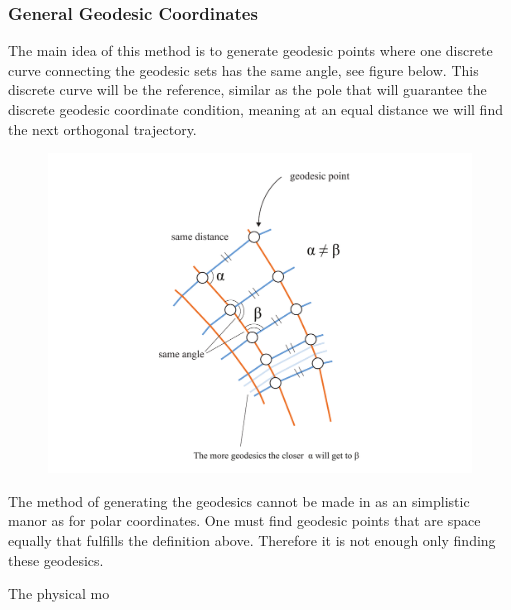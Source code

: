 \subsubsection{General Geodesic Coordinates}

The main idea of this method is to generate geodesic points where one discrete curve connecting the geodesic sets has the same angle, see figure below. This discrete curve will be the reference, similar as the pole that will guarantee the discrete geodesic coordinate condition, meaning at an equal distance we will find the next orthogonal trajectory.

\begin{figure}[H]
\centering
\includegraphics[width=0.9\linewidth ]{figure/Method/discreteGeodesicCoord2.pdf}
\caption{}
\end{figure}

The method of generating the geodesics cannot be made in as an simplistic manor as for polar coordinates. One must find geodesic points that are space equally that fulfills the definition above. Therefore it is not enough only finding these geodesics.

The physical mo

